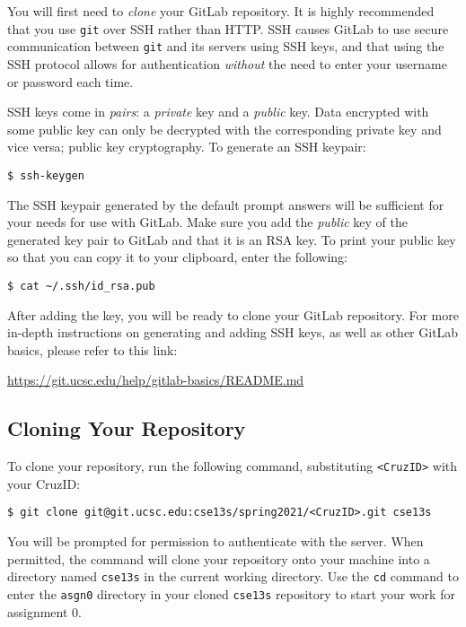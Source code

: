 \documentclass[11pt]{article}
\begin{document}
You will first need to \emph{clone} your GitLab repository. It is highly
recommended that you use \texttt{git} over SSH rather than HTTP.  SSH causes
GitLab to use secure communication between \texttt{git} and its servers using
SSH keys, and that using the SSH protocol allows for authentication
\emph{without} the need to enter your username or password each time.

SSH keys come in \emph{pairs}: a \emph{private} key and a \emph{public} key.
Data encrypted with some public key can only be decrypted with the corresponding
private key and vice versa; public key cryptography. To generate an SSH keypair:

\begin{lstlisting}[style=bashstyle]
  $ ssh-keygen
\end{lstlisting}

The SSH keypair generated by the default prompt answers will be sufficient for
your needs for use with GitLab. Make sure you add the \emph{public} key of the
generated key pair to GitLab and that it is an RSA key. To print your public key
so that you can copy it to your clipboard, enter the following:

\begin{lstlisting}[style=bashstyle]
  $ cat ~/.ssh/id_rsa.pub
\end{lstlisting}

After adding the key, you will be ready to clone your GitLab repository. For
more in-depth instructions on generating and adding SSH keys, as well as other
GitLab basics, please refer to this link:

\centerline{\url{https://git.ucsc.edu/help/gitlab-basics/README.md}}

\subsection{Cloning Your Repository}

To clone your repository, run the following command, substituting
\texttt{<CruzID>} with your CruzID:

\begin{lstlisting}[style=bashstyle]
  $ git clone git@git.ucsc.edu:cse13s/spring2021/<CruzID>.git cse13s
\end{lstlisting}

You will be prompted for permission to authenticate with the server.
When permitted, the command will clone your repository onto your machine into a
directory named \texttt{cse13s} in the current working directory. Use the
\texttt{cd} command to enter the \texttt{asgn0} directory in your cloned
\texttt{cse13s} repository to start your work for assignment 0.
\end{document}
